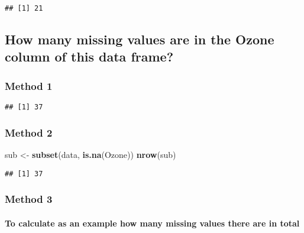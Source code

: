 \documentclass[]{article}
\newenvironment{Shaded}{\begin{snugshade}}{\end{snugshade}}
\newcommand{\KeywordTok}[1]{\textcolor[rgb]{0.13,0.29,0.53}{\textbf{#1}}}
\newcommand{\NormalTok}[1]{#1}
\newcommand{\OperatorTok}[1]{\textcolor[rgb]{0.81,0.36,0.00}{\textbf{#1}}}
\newcommand{\StringTok}[1]{\textcolor[rgb]{0.31,0.60,0.02}{#1}}
\let\oldparagraph\paragraph
\renewcommand{\paragraph}[1]{\oldparagraph{#1}\mbox{}}
\begin{document}
\begin{verbatim}
## [1] 21
\end{verbatim}

\hypertarget{how-many-missing-values-are-in-the-ozone-column-of-this-data-frame}{%
\subsection{How many missing values are in the Ozone column of this data
frame?}\label{how-many-missing-values-are-in-the-ozone-column-of-this-data-frame}}

\hypertarget{method-1-2}{%
\subsubsection{Method 1}\label{method-1-2}}

\begin{Shaded}
\end{Shaded}

\begin{verbatim}
## [1] 37
\end{verbatim}

\hypertarget{method-2-2}{%
\subsubsection{Method 2}\label{method-2-2}}

\begin{Shaded}
\begin{Highlighting}[]
\NormalTok{sub <-}\StringTok{ }\KeywordTok{subset}\NormalTok{(data, }\KeywordTok{is.na}\NormalTok{(Ozone))}
\KeywordTok{nrow}\NormalTok{(sub)}
\end{Highlighting}
\end{Shaded}

\begin{verbatim}
## [1] 37
\end{verbatim}

\hypertarget{method-3-2}{%
\subsubsection{Method 3}\label{method-3-2}}

\hypertarget{to-calculate-as-an-example-how-many-missing-values-there-are-in-total}{%
\paragraph{To calculate as an example how many missing values there are
in
total}\label{to-calculate-as-an-example-how-many-missing-values-there-are-in-total}}
\end{document}

